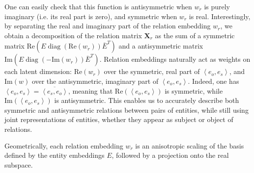 \documentclass{article}
\newcommand{\diag}{\mathop{\textrm{diag}}}
\newcommand{\transp}{^{T}}
\newcommand{\real}{\mathrm{Re}}
\newcommand{\imag}{\mathrm{Im}}
\newcommand{\Relation}{\mathbf{X}}
\newcommand{\Eemb}{E} %
\newcommand{\wemb}{w} %
\newcommand{\Johans}[1]{\todo[inline,backgroundcolor=green!20!green]{Johans: #1}}
\begin{document}
One can easily check that this function is antisymmetric when $w_r$ is purely imaginary (i.e. its real part is zero), and symmetric when $w_r$ is real. 
Interestingly, by separating the real and imaginary part of the relation embedding $\wemb_r$,
we obtain a decomposition of the relation matrix $\Relation_r$ as the sum of a symmetric matrix
$\real( \Eemb\diag(\real(\wemb_r)) \bar\Eemb\transp )$
and a antisymmetric matrix
$\imag( \Eemb \diag(-\imag(\wemb_r)) \bar\Eemb\transp )$. 
Relation embeddings naturally act as weights on each latent dimension: $\real(w_r)$ over the symmetric, real part of $\left< e_o, e_s \right>$, and $\imag(w)$ over the antisymmetric, imaginary part
of $\left< e_o, e_s \right>$. Indeed, one has $\left< e_o, e_s \right> = \overline{\left< e_s, e_o \right>}$, meaning that $\real(\left< e_o, e_s \right>)$ is symmetric, while $\imag(\left< e_o, e_s \right>)$ is antisymmetric. This enables us to accurately describe both symmetric and antisymmetric relations between pairs of entities, while still using joint representations of entities, whether they appear as subject or object of relations. 

Geometrically, each relation embedding $w_r$ is an anisotropic
scaling of the basis defined by the entity embeddings $E$, followed by a projection
onto the real subspace.





\end{document}
